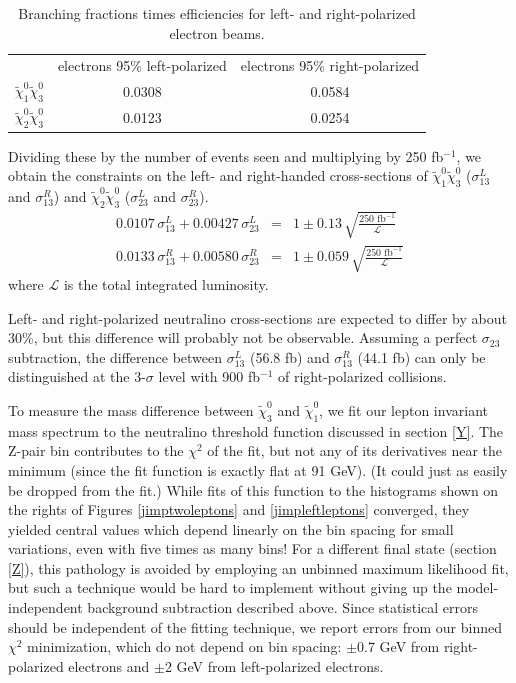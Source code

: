 \documentclass[12pt]{article}
\begin{document}
\begin{table}[!h]
  \begin{center}
    \renewcommand{\arraystretch}{1.5}
    \begin{tabular}{c c c}
      & electrons 95\% left-polarized & electrons 95\% right-polarized \\
      $\tilde{\chi}^0_1\tilde{\chi}^0_3$ & 0.0308 & 0.0584 \\
      $\tilde{\chi}^0_2\tilde{\chi}^0_3$ & 0.0123 & 0.0254
    \end{tabular}
    \renewcommand{\arraystretch}{1}
    \vspace{-0.5 cm}
  \end{center}

  \caption{Branching fractions times efficiencies for left- and
  right-polarized electron beams.  \label{jimpbetable}}

\end{table}

Dividing these by the number of events seen and multiplying by 250
fb$^{-1}$, we obtain the constraints on the left- and right-handed
cross-sections of $\tilde{\chi}^0_1\tilde{\chi}^0_3$ ($\sigma_{13}^L$
and $\sigma_{13}^R$) and $\tilde{\chi}^0_2\tilde{\chi}^0_3$
($\sigma_{23}^L$ and $\sigma_{23}^R$).
\begin{eqnarray}
  0.0107 \, \sigma_{13}^L + 0.00427 \, \sigma_{23}^L &=& 1 \pm 0.13 \, \sqrt{\frac{250 \mbox{ fb}^{-1}}{\mathcal{L}}} \\
  0.0133 \, \sigma_{13}^R + 0.00580 \, \sigma_{23}^R &=& 1 \pm 0.059 \, \sqrt{\frac{250 \mbox{ fb}^{-1}}{\mathcal{L}}}
\end{eqnarray}
where $\mathcal{L}$ is the total integrated luminosity.

Left- and right-polarized neutralino cross-sections are expected to
differ by about 30\%, but this difference will probably not be
observable.  Assuming a perfect $\sigma_{23}$ subtraction, the
difference between $\sigma_{13}^L$ (56.8 fb) and $\sigma_{13}^R$ (44.1
fb) can only be distinguished at the 3-$\sigma$ level with 900
fb$^{-1}$ of right-polarized collisions.

To measure the mass difference between $\tilde{\chi}^0_3$ and
$\tilde{\chi}^0_1$, we fit our lepton invariant mass spectrum to the
neutralino threshold function discussed in section \ref{Y}.  The
Z-pair bin contributes to the $\chi^2$ of the fit, but not any of its
derivatives near the minimum (since the fit function is exactly flat
at 91 GeV).  (It could just as easily be dropped from the fit.)  While
fits of this function to the histograms shown on the rights of Figures
\ref{jimptwoleptons} and \ref{jimpleftleptons} converged, they yielded
central values which depend linearly on the bin spacing for small
variations, even with five times as many bins!  For a different final
state (section \ref{Z}), this pathology is avoided by employing an
unbinned maximum likelihood fit, but such a technique would be hard to
implement without giving up the model-independent background
subtraction described above.  Since statistical errors should be
independent of the fitting technique, we report errors from our binned
$\chi^2$ minimization, which do not depend on bin spacing: $\pm$0.7
GeV from right-polarized electrons and $\pm$2 GeV from left-polarized
electrons.
\end{document}
